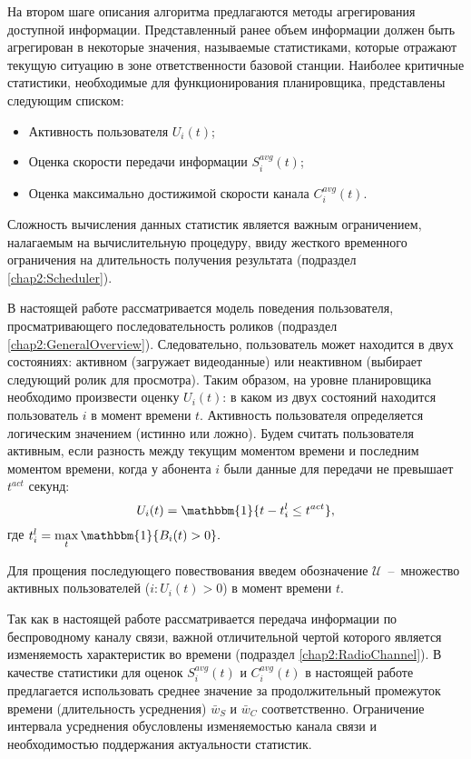 На втором шаге описания алгоритма предлагаются методы агрегирования доступной информации. Представленный ранее объем информации должен быть агрегирован в некоторые значения, называемые статистиками, которые отражают текущую ситуацию в зоне ответственности базовой станции. Наиболее критичные статистики, необходимые для функционирования планировщика, представлены следующим списком:
\begin{itemize}
	\item Активность пользователя $U_i(t)$;
	\item Оценка скорости передачи информации $S_i^{avg}(t)$;
	\item Оценка максимально достижимой скорости канала $C_i^{avg}(t)$.
\end{itemize}
Сложность вычисления данных статистик является важным ограничением, налагаемым на вычислительную процедуру, ввиду жесткого временного ограничения на длительность получения результата (подраздел \ref{chap2:Scheduler}).

В настоящей работе рассматривается модель поведения пользователя, просматривающего последовательность роликов (подраздел \ref{chap2:GeneralOverview}). Следовательно, пользователь может находится в двух состояниях: активном (загружает видеоданные) или неактивном (выбирает следующий ролик для просмотра). Таким образом, на уровне планировщика необходимо произвести оценку $U_i(t)$: в каком из двух состояний находится пользователь $i$ в момент времени $t$. Активность пользователя определяется логическим значением (истинно или ложно). Будем считать пользователя активным, если разность между текущим моментом времени и последним моментом времени, когда у абонента $i$ были данные для передачи не превышает $t^{act}$ секунд:
\begin{equation}
	\label{eq:activityEstimation}
	U_i(t) = \mathbbm{1}\{t - t_i^{l} \leq t^{act}\},
\end{equation}
где $t_i^{l} = \max\limits_{t} \mathbbm{1}\{B_i(t) > 0\}.$

Для прощения последующего повествования введем обозначение $\mathcal{U}$~--~множество активных пользователей ($i:U_i(t) > 0$) в момент времени $t$.

Так как в настоящей работе рассматривается передача информации по беспроводному каналу связи, важной отличительной чертой которого является изменяемость характеристик во времени (подраздел \ref{chap2:RadioChannel}). В качестве статистики для оценок $S_i^{avg}(t)$ и $C_i^{avg}(t)$ в настоящей работе предлагается использовать среднее значение за продолжительный промежуток времени (длительность усреднения) $\bar{w}_{S}$ и $\bar{w}_{C}$ соответственно. Ограничение интервала усреднения обусловлены изменяемостью канала связи и необходимостью поддержания актуальности статистик.

